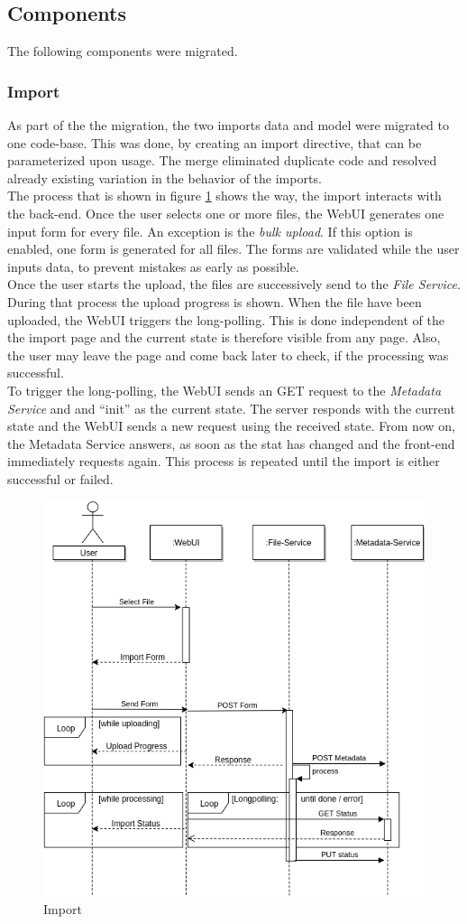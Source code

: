 \subsection{Components}
The following components were migrated.

\subsubsection{Import}
As part of the the migration, the two imports data and model were migrated to one code-base. This was done, by creating an import directive, that can be parameterized upon usage. The merge eliminated duplicate code and resolved already existing variation in the behavior of the imports.\\
The process that is shown in figure \ref{fig:import} shows the way, the import interacts with the back-end. Once the user selects one or more files, the WebUI generates one input form for every file. An exception is the \textit{bulk upload}. If this option is enabled, one form is generated for all files. The forms are validated while the user inputs data, to prevent mistakes as early as possible.\\
Once the user starts the upload, the files are successively send to the \textit{File Service}. During that process the upload progress is shown. When the file have been uploaded, the WebUI triggers the long-polling. This is done independent of the the import page and the current state is therefore visible from any page. Also, the user may leave the page and come back later to check, if the processing was successful.\\
To trigger the long-polling, the WebUI sends an GET request to the \textit{Metadata Service} and and \enquote{init} as the current state. The server responds with the current state and the WebUI sends a new request using the received state. From now on, the Metadata Service answers, as soon as the stat has changed and the front-end immediately requests again. This process is repeated until the import is either successful or failed.
\begin{figure}[H]
	\centering\includegraphics[width=.75\textwidth]{res/Import}
	\caption{Import}
	\label{fig:import}
\end{figure}



